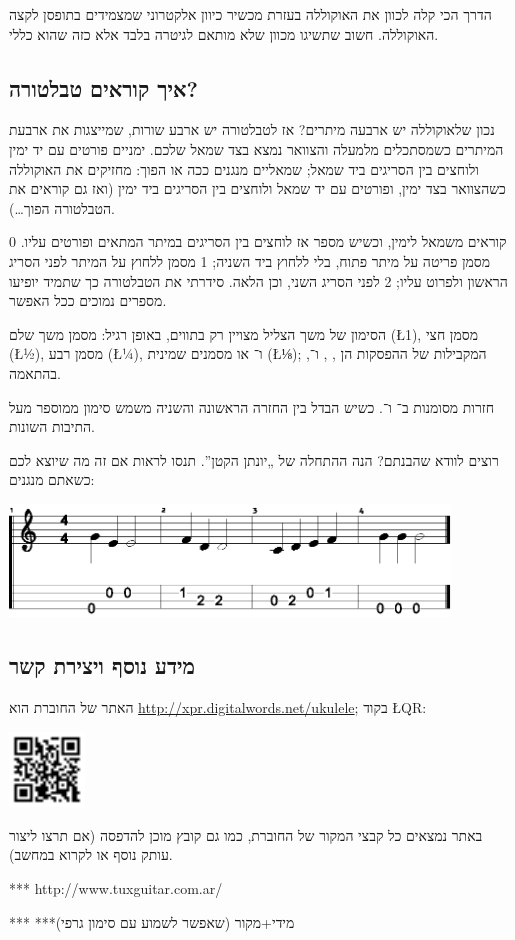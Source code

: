הדרך הכי קלה לכוון את האוקוללה בעזרת מכשיר כיוון אלקטרוני שמצמידים בתופסן לקצה האוקוללה. חשוב שתשיגו מכוון שלא מותאם לגיטרה בלבד אלא כזה שהוא כללי.



\subsection*{איך קוראים טבלטורה?}

נכון שלאוקוללה יש ארבעה מיתרים? אז לטבלטורה יש ארבע שורות, שמייצגות את ארבעת המיתרים כשמסתכלים מלמעלה והצוואר נמצא בצד שמאל שלכם. ימניים פורטים עם יד ימין ולוחצים בין הסריגים ביד שמאל; שמאליים מנגנים ככה או הפוך: מחזיקים את האוקוללה כשהצוואר בצד ימין, ופורטים עם יד שמאל ולוחצים בין הסריגים ביד ימין (ואז גם קוראים את הטבלטורה הפוך…).

קוראים משמאל לימין, וכשיש מספר אז לוחצים בין הסריגים במיתר המתאים ופורטים עליו. 0 מסמן פריטה על מיתר פתוח, בלי ללחוץ ביד השניה; 1 מסמן ללחוץ על המיתר לפני הסריג הראשון ולפרוט עליו; 2 לפני הסריג השני, וכן הלאה. סידרתי את הטבלטורה כך שתמיד יופיעו מספרים נמוכים ככל האפשר.

הסימון של משך הצליל מצויין רק בתווים, באופן רגיל:  מסמן משך שלם (\L{1}),  מסמן חצי (\L{½}),  מסמן רבע (\L{¼}), ו־ או  מסמנים שמינית (\L{⅛}); המקבילות של ההפסקות הן , ,  ו־, בהתאמה.

חזרות מסומנות ב־ ו־. כשיש הבדל בין החזרה הראשונה והשניה משמש סימון  ממוספר מעל התיבות השונות.

רוצים לוודא שהבנתם? הנה ההתחלה של „יונתן הקטן”. תנסו לראות אם זה מה שיוצא לכם כשאתם מנגנים:

\begin{center}
	\includegraphics[height=3cm]{jon.eps}
\end{center}


\subsection*{מידע נוסף ויצירת קשר}

האתר של החוברת הוא \url{http://xpr.digitalwords.net/ukulele}; בקוד \L{QR}:

\begin{center}
	\includegraphics[width=2cm]{retejo.png}
\end{center}

באתר נמצאים כל קבצי המקור של החוברת, כמו גם קובץ מוכן להדפסה (אם תרצו ליצור עותק נוסף או לקרוא במחשב). 

*** http://www.tuxguitar.com.ar/

***
***מידי+מקור (שאפשר לשמוע עם סימון גרפי)
